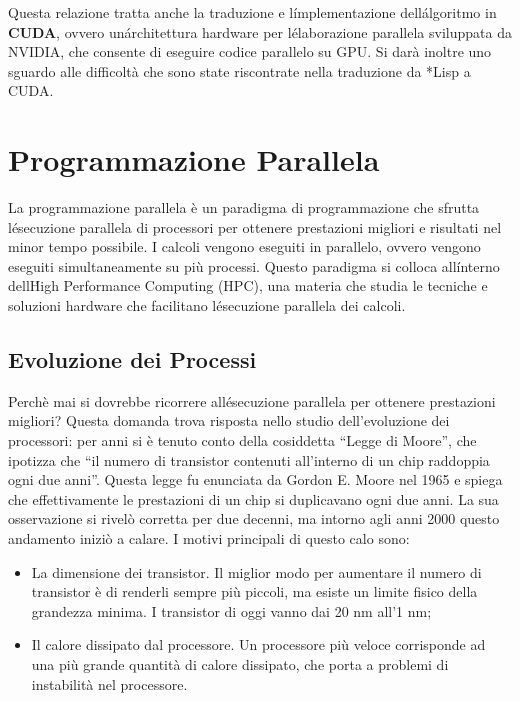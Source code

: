 \documentclass[12pt,a4paper,openright,twoside]{report}
\begin{document}
Questa relazione tratta anche la traduzione e l\'implementazione dell\'algoritmo in \textbf{CUDA}, ovvero un\'architettura hardware per l\'elaborazione parallela sviluppata da NVIDIA, che consente di eseguire codice parallelo su GPU. Si darà inoltre uno sguardo alle difficoltà che sono state riscontrate nella traduzione da *Lisp a CUDA.



\rhead[\fancyplain{}{\bfseries\leftmark}]{\fancyplain{}{\bfseries\thepage}}
\clearpage{\pagestyle{empty}\cleardoublepage}
\clearpage{\pagestyle{empty}\cleardoublepage}
\chapter{Programmazione Parallela}

\lhead[\fancyplain{}{\bfseries\thepage}]{\fancyplain{}{\bfseries\rightmark}}

La programmazione parallela è un paradigma di programmazione che sfrutta l\'esecuzione parallela di processori per ottenere prestazioni migliori e risultati nel minor tempo possibile. I calcoli vengono eseguiti in parallelo, ovvero vengono eseguiti simultaneamente su più processi. Questo paradigma si colloca all\'interno dell\'High Performance Computing (HPC), una materia che studia le tecniche e soluzioni hardware che facilitano l\'esecuzione parallela dei calcoli.



\section{Evoluzione dei Processi}

Perchè mai si dovrebbe ricorrere all\'esecuzione parallela per ottenere prestazioni migliori? Questa domanda trova risposta nello studio dell'evoluzione dei processori: per anni si è tenuto conto della cosiddetta ``Legge di Moore'', che ipotizza che ``il numero di transistor contenuti all'interno di un chip raddoppia ogni due anni''. Questa legge fu enunciata da Gordon E. Moore nel 1965 e spiega che effettivamente le prestazioni di un chip si duplicavano ogni due anni. La sua osservazione si rivelò corretta per due decenni, ma intorno agli anni 2000 questo andamento iniziò a calare. I motivi principali di questo calo sono:

\begin{itemize}
    \item La dimensione dei transistor. Il miglior modo per aumentare il numero di transistor è di renderli sempre più piccoli, ma esiste un limite fisico della grandezza minima. I transistor di oggi vanno dai 20 nm all'1 nm;
    \item Il calore dissipato dal processore. Un processore più veloce corrisponde ad una più grande quantità di calore dissipato, che porta a problemi di instabilità nel processore.
\end{itemize}
\end{document}
